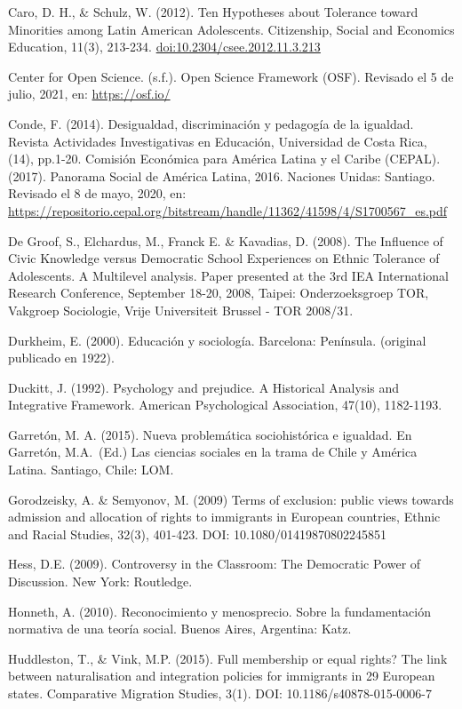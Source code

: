 \documentclass[12pt,twoside]{templates/facsothesis}
\begin{document}
Caro, D. H., \& Schulz, W. (2012). Ten Hypotheses about Tolerance toward Minorities among Latin American Adolescents. Citizenship, Social and Economics Education, 11(3), 213-234. \url{doi:10.2304/csee.2012.11.3.213}

Center for Open Science. (s.f.). Open Science Framework (OSF). Revisado el 5 de julio, 2021, en: \url{https://osf.io/}

Conde, F. (2014). Desigualdad, discriminación y pedagogía de la igualdad. Revista Actividades Investigativas en Educación, Universidad de Costa Rica, (14), pp.1-20.
Comisión Económica para América Latina y el Caribe (CEPAL). (2017). Panorama Social de América Latina, 2016. Naciones Unidas: Santiago. Revisado el 8 de mayo, 2020, en: \url{https://repositorio.cepal.org/bitstream/handle/11362/41598/4/S1700567_es.pdf}

De Groof, S., Elchardus, M., Franck E. \& Kavadias, D. (2008). The Influence of Civic Knowledge versus Democratic School Experiences on Ethnic Tolerance of Adolescents. A Multilevel analysis. Paper presented at the 3rd IEA International Research Conference, September 18-20, 2008, Taipei: Onderzoeksgroep TOR, Vakgroep Sociologie, Vrije Universiteit Brussel - TOR 2008/31.

Durkheim, E. (2000). Educación y sociología. Barcelona: Península. (original publicado en 1922).

Duckitt, J. (1992). Psychology and prejudice. A Historical Analysis and Integrative Framework. American Psychological Association, 47(10), 1182-1193.

Garretón, M. A. (2015). Nueva problemática sociohistórica e igualdad. En Garretón, M.A.~(Ed.) Las ciencias sociales en la trama de Chile y América Latina. Santiago, Chile: LOM.

Gorodzeisky, A. \& Semyonov, M. (2009) Terms of exclusion: public views towards admission and allocation of rights to immigrants in European countries, Ethnic and Racial Studies, 32(3), 401-423. DOI: 10.1080/01419870802245851

Hess, D.E. (2009). Controversy in the Classroom: The Democratic Power of Discussion. New York: Routledge.

Honneth, A. (2010). Reconocimiento y menosprecio. Sobre la fundamentación normativa de una teoría social. Buenos Aires, Argentina: Katz.

Huddleston, T., \& Vink, M.P. (2015). Full membership or equal rights? The link between naturalisation and integration policies for immigrants in 29 European states. Comparative Migration Studies, 3(1). DOI: 10.1186/s40878-015-0006-7
\end{document}
